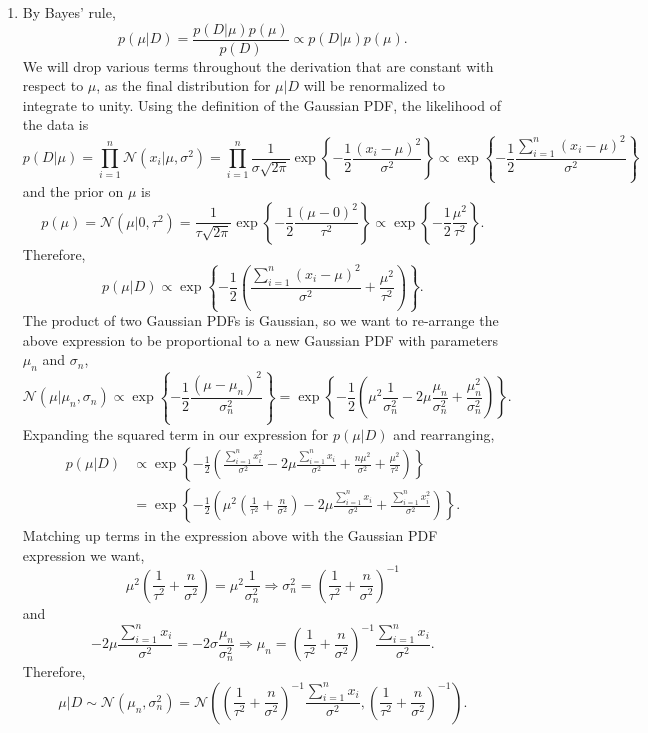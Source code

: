 \documentclass[submit]{harvardml}
\begin{document}
\begin{enumerate}
	\item By Bayes' rule,
	$$p(\mu|D) = \frac{p(D|\mu)p(\mu)}{p(D)} \propto p(D|\mu)p(\mu).$$
	We will drop various terms throughout the derivation that are constant with respect to $\mu$, as the final distribution for $\mu|D$ will be renormalized to integrate to unity. Using the definition of the Gaussian PDF, the likelihood of the data is
	$$p(D|\mu) = \prod_{i=1}^n \mathcal{N}(x_i | \mu, \sigma^2) = \prod_{i=1}^n \frac{1}{\sigma \sqrt{2\pi}} \exp\left\{-\frac12\frac{(x_i - \mu)^2}{\sigma^2}\right\} \propto \exp\left\{-\frac12\frac{\sum_{i=1}^n(x_i - \mu)^2}{\sigma^2}\right\}$$
	and the prior on $\mu$ is
	$$p(\mu) = \mathcal{N}(\mu | 0, \tau^2) = \frac{1}{\tau \sqrt{2\pi}} \exp\left\{-\frac12\frac{(\mu - 0)^2}{\tau^2}\right\} \propto \exp\left\{-\frac12\frac{\mu^2}{\tau^2}\right\}.$$
	Therefore,
	$$p(\mu | D) \propto \exp\left\{-\frac12\left(\frac{\sum_{i=1}^n(x_i - \mu)^2}{\sigma^2} + \frac{\mu^2}{\tau^2}\right)\right\}.$$
	The product of two Gaussian PDFs is Gaussian, so we want to re-arrange the above expression to be proportional to a new Gaussian PDF with parameters $\mu_n$ and $\sigma_n$,
	$$\mathcal{N}(\mu | \mu_n, \sigma_n) \propto \exp\left\{-\frac12 \frac{(\mu - \mu_n)^2}{\sigma_n^2}\right\} = \exp\left\{-\frac12 \left(\mu^2\frac{1}{\sigma_n^2} -2 \mu\frac{\mu_n}{\sigma_n^2} + \frac{\mu_n^2}{\sigma_n^2}\right)\right\}.$$
	Expanding the squared term in our expression for $p(\mu|D)$ and rearranging,
	\begin{align*}
		p(\mu | D) &\propto \exp\left\{-\frac12\left(\frac{\sum_{i=1}^n x_i^2}{\sigma^2} -2\mu \frac{\sum_{i=1}^n x_i}{\sigma^2} + \frac{n\mu^2}{\sigma^2} + \frac{\mu^2}{\tau^2}\right)\right\} \\
		&= \exp\left\{-\frac12\left(\mu^2\left(\frac{1}{\tau^2} + \frac{n}{\sigma^2}\right) -2\mu\frac{\sum_{i=1}^n x_i}{\sigma^2} + \frac{\sum_{i=1}^n x_i^2}{\sigma^2} \right)\right\}.
	\end{align*}
	Matching up terms in the expression above with the Gaussian PDF expression we want,
	$$\mu^2\left(\frac{1}{\tau^2} + \frac{n}{\sigma^2}\right) = \mu^2 \frac{1}{\sigma_n^2} \Rightarrow \sigma_n^2 = \left(\frac{1}{\tau^2} + \frac{n}{\sigma^2}\right)^{-1}$$
	and
	$$-2\mu\frac{\sum_{i=1}^n x_i}{\sigma^2} = -2\sigma\frac{\mu_n}{\sigma_n^2} \Rightarrow \mu_n = \left(\frac{1}{\tau^2} + \frac{n}{\sigma^2}\right)^{-1} \frac{\sum_{i=1}^n x_i}{\sigma^2}.$$
	Therefore,
	$$\mu | D \sim \mathcal{N}(\mu_n, \sigma_n^2) = \mathcal{N}\left(\left(\frac{1}{\tau^2} + \frac{n}{\sigma^2}\right)^{-1} \frac{\sum_{i=1}^n x_i}{\sigma^2}, \left(\frac{1}{\tau^2} + \frac{n}{\sigma^2}\right)^{-1}\right).$$
	

\end{enumerate}
\end{document}
